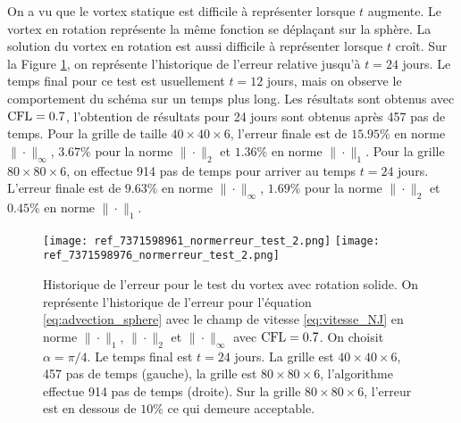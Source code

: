 On a vu que le vortex statique est difficile à représenter lorsque $t$ augmente. Le vortex en rotation représente la même fonction se déplaçant sur la sphère. La solution du vortex en rotation est aussi difficile à représenter lorsque $t$ croît. Sur la Figure \ref{fig:NJ24jours}, on représente l'historique de l'erreur relative jusqu'à $t=24$ jours. Le temps final pour ce test est usuellement $t=12$ jours, mais on observe le comportement du schéma sur un temps plus long. Les résultats sont obtenus avec $\text{CFL} = 0.7$, l'obtention de résultats pour 24 jours sont obtenus après 457 pas de temps. Pour la grille de taille $40 \times 40 \times 6$, l'erreur finale est de $15.95\%$ en norme $\| \cdot \|_{\infty}$, $3.67\%$ pour la norme $\| \cdot \|_{2}$ et $1.36\%$ en norme $\| \cdot \|_{1}$. Pour la grille $80 \times 80 \times 6$, on effectue 914 pas de temps pour arriver au temps $t=24$ jours. L'erreur finale est de $9.63\%$ en norme $\| \cdot \|_{\infty}$, $1.69\%$ pour la norme $\| \cdot \|_{2}$ et $0.45\%$ en norme $\| \cdot \|_{1}$.

\begin{figure}[htbp]
\begin{center}
\texttt{[image: ref\_7371598961\_normerreur\_test\_2.png]}
\texttt{[image: ref\_7371598976\_normerreur\_test\_2.png]}
\end{center}
\caption{Historique de l'erreur pour le test du vortex avec rotation solide. On représente l'historique de l'erreur pour l'équation \eqref{eq:advection_sphere} avec le champ de vitesse \eqref{eq:vitesse_NJ} en norme $\| \cdot \|_1$, $\| \cdot \|_2$ et $\| \cdot \|_{\infty}$ avec $\text{CFL} = 0.7$. On choisit $\alpha = \pi/4$. Le temps final est $t=24$ jours. La grille est $40 \times 40  \times 6$, 457 pas de temps (gauche), la grille est $80 \times 80  \times 6$, l'algorithme effectue 914 pas de temps (droite). Sur la grille $80 \times 80 \times 6$, l'erreur est en dessous de $10 \%$ ce qui demeure acceptable.}
\label{fig:NJ24jours}
\end{figure} 

